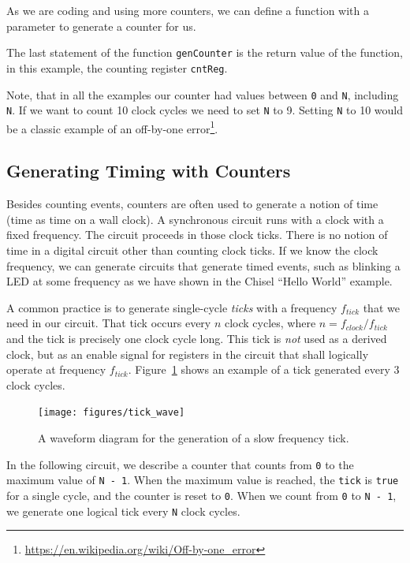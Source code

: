 \documentclass[%
    10pt,
    headinclude, footexclude,
    openright, %
    notitlepage,
    cleardoubleempty,
    headsepline,
    pointlessnumbers,
    bibtotoc, idxtotoc,
    ]{scrbook}
\newcommand{\code}[1]{{\small{\texttt{#1}}}}
\newcommand{\myref}[2]{\href{#1}{#2}}
\renewcommand{\myref}[2]{{#2}{\footnote{\url{#1}}}}
\begin{document}

\noindent As we are coding and using more counters, we can
define a function with a parameter to generate a counter for us.


\noindent The last statement of the function \code{genCounter} is the return
value of the function, in this example, the counting register \code{cntReg}.

Note, that in all the examples our counter had values between \code{0} and
\code{N}, including \code{N}. If we want to count 10 clock cycles we need
to set \code{N} to 9. Setting \code{N} to 10 would be a classic example of an
\myref{https://en.wikipedia.org/wiki/Off-by-one_error}{off-by-one error}.

\subsection{Generating Timing with Counters}
\label{sec:gen:timing}


Besides counting events, counters are often used to generate a notion of time
(time as time on a wall clock).
A synchronous circuit runs with a clock with a fixed frequency.
The circuit proceeds in those clock ticks. There is no notion of time in a digital
circuit other than counting clock ticks. If we know the clock frequency, we
can generate circuits that generate timed events, such as blinking a LED
at some frequency as we have shown in the Chisel ``Hello World'' example.

A common practice is to generate single-cycle \emph{ticks} with a frequency $f_{tick}$
that we need in our circuit. That tick occurs every $n$ clock cycles,
where $n = f_{clock}/f_{tick}$ and the tick is precisely one clock cycle long.
This tick is \emph{not} used as a derived clock, but as an enable signal for
registers in the circuit that shall logically operate at frequency $f_{tick}$.
Figure~\ref{fig:tick-wave} shows an example of a tick generated every
3 clock cycles.

\begin{figure}
  \centering
  \texttt{[image: figures/tick\_wave]}
  \caption{A waveform diagram for the generation of a slow frequency tick.}
  \label{fig:tick-wave}
\end{figure}


In the following circuit, we describe a counter that counts from \code{0}
to the maximum value of \code{N - 1}. When the maximum value is reached,
the \code{tick} is \code{true} for a single cycle, and the counter is reset to \code{0}.
When we count from \code{0} to \code{N - 1}, we generate one logical tick
every \code{N} clock cycles.
\end{document}
